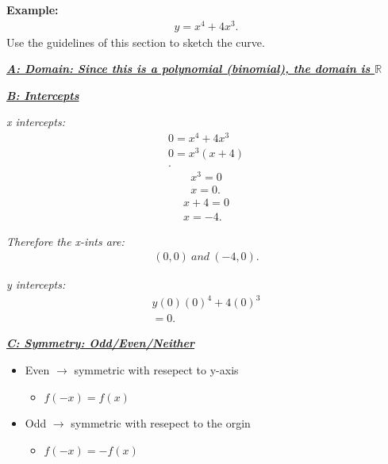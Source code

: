 \documentclass{report}
\begin{document}
  \bigbreak \noindent 
  \begin{mdframed}
    \textbf{Example:}
    \begin{align*}
      y = x^{4} + 4x^{3}
    .\end{align*}
    \bigbreak \noindent 
    Use the guidelines of this section to sketch the curve.
  \end{mdframed}

  \bigbreak \noindent 
  \textbf{\textit{\underline{A: Domain: Since this is a polynomial (binomial), the domain is $ \mathbb{R} $ }}}

  \bigbreak \noindent 
  \textbf{\textit{\underline{B: Intercepts}}}

  \bigbreak \noindent 
  \textit{x intercepts:}
  \begin{align*}
    0 = x^{4} + 4x^{3}  \\
    0 = x^{3}(x+4) \\
  .\end{align*}
  \begin{align*}
    x^{3} = 0 \\
    x = 0
  .\end{align*}
  \begin{align*}
    x+4 = 0 \\
    x = -4
  .\end{align*}

  \bigbreak \noindent 
  \textit{Therefore the x-ints are:}
  \begin{align*}
    \boxed{(0,0)\ and\ (-4,0)}
  .\end{align*}

  \bigbreak \noindent 
  \textit{y intercepts:}
  \begin{align*}
    y(0) (0)^{4} + 4(0)^{3} \\
    \boxed{= 0}
  .\end{align*}

  \bigbreak \noindent 
  \textbf{\textit{\underline{C: Symmetry: Odd/Even/Neither}}}
  \begin{itemize}
    \item Even $\longrightarrow$ symmetric with resepect to y-axis
      \begin{itemize}
        \item $f(-x) = f(x) $
      \end{itemize}
    \item Odd $\longrightarrow$ symmetric with resepect to the orgin
      \begin{itemize}
        \item $f(-x) = -f(x) $
      \end{itemize}
  \end{itemize}
\end{document}
